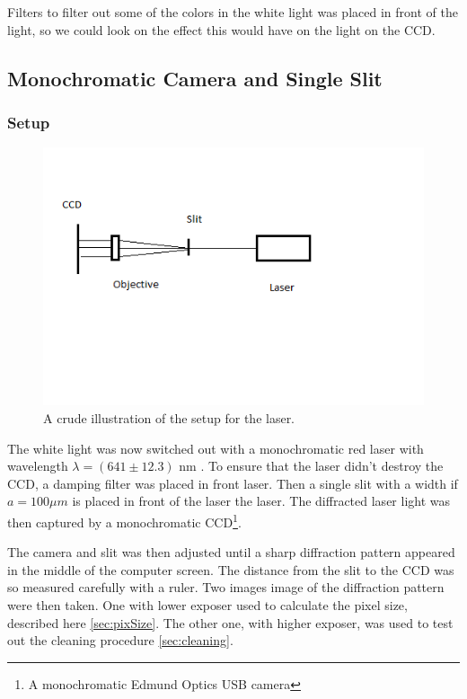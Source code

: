 \documentclass{emulateapj}
\begin{document}
Filters to filter out some of the colors in the white light was placed in front of the light, so we could look on the effect this would have on the light on the CCD. 


\subsection{Monochromatic Camera and Single Slit}

\subsubsection{Setup}
\label{sec:setup}

\begin{figure}[H]
\centering
\includegraphics[scale=0.4]{setupLaser.png}
\caption{A crude illustration of the setup for the laser.}
\end{figure}

The white light was now switched out with a monochromatic red laser with wavelength $\lambda = (641 \pm 12.3)$ nm \cite{laser}. To ensure that the laser didn't destroy the CCD, a damping filter was placed in front laser. Then a single slit with a width if $a = 100\mu m$ is placed in front of the laser the laser. The diffracted laser light was then captured by a monochromatic CCD\footnote{A monochromatic Edmund Optics USB camera}. 

The camera and slit was then adjusted until a sharp diffraction pattern appeared in the middle of the computer screen. The distance from the slit to the CCD was so measured carefully with a ruler. Two images image of the diffraction pattern were then taken. One with lower exposer used to calculate the pixel size, described here \ref{sec:pixSize}. The other one, with higher exposer, was used to test out the cleaning procedure \ref{sec:cleaning}.
\end{document}
